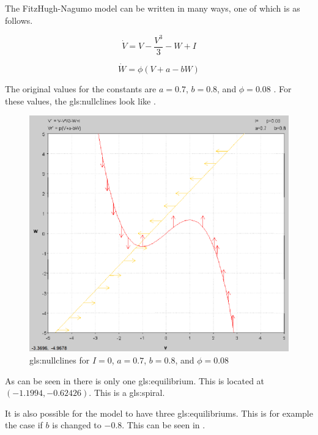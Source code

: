\documentclass[../Orator]{subfiles}
\begin{document}
The FitzHugh-Nagumo model can be written in many ways, one of which is as follows.

\begin{equation}
    \dot{V}=V-\frac{V^{3}}{3}-W+I
\end{equation}

\begin{equation}
    \dot{W}=\phi (V+a-bW)
\end{equation}

The original values for the constants are \(a=0.7\), \(b=0.8\), and \(\phi=0.08\) \cite{}. For these values, the \glspl{gls:nullcline} look like . 

\begin{figure}[ht]
    \centering
    \includegraphics[width=400pt]{Pictures/Alex/Nullclines - original.PNG}
    \caption{\Glspl{gls:nullcline} for \(I=0\), \(a=0.7\), \(b=0.8\), and \(\phi=0.08\)}
    \label{fig:nullclines-original}
\end{figure}

As can be seen in  there is only one \gls{gls:equilibrium}. This is located at \((-1.1994, -0.62426)\). This is a \gls{gls:spiral}. 

It is also possible for the model to have three \glspl{gls:equilibrium}. This is for example the case if \(b\) is changed to \(-0.8\). This can be seen in .
\end{document}
